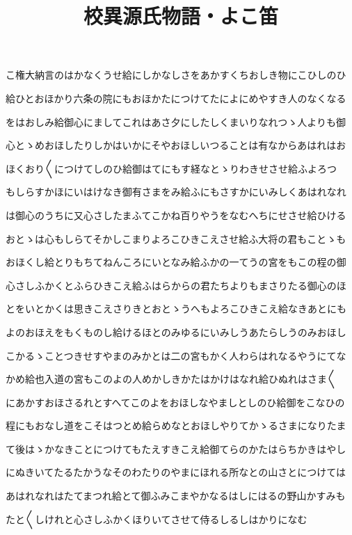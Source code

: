 \documentclass[a4paper,11pt,landscape]{ltjtarticle}
\title{校異源氏物語・よこ笛}
\date{}
\begin{document}
\maketitle

こ権大納言のはかなくうせ給にしかなしさをあかすくちおしき物にこひしのひ
\par\medskip
給ひとおほかり六条の院にもおほかたにつけてたによにめやすき人のなくなる
\par\medskip
をはおしみ給御心にましてこれはあさ夕にしたしくまいりなれつゝ人よりも御
\par\medskip
心とゝめおほしたりしかはいかにそやおほしいつることは有なからあはれはお
\par\medskip
ほくおり〱につけてしのひ給御はてにもす経なとゝりわきせさせ給ふよろつ
\par\medskip
もしらすかほにいはけなき御有さまをみ給ふにもさすかにいみしくあはれなれ
\par\medskip
は御心のうちに又心さしたまふてこかね百りやうをなむへちにせさせ給ひける
\par\medskip
おとゝは心もしらてそかしこまりよろこひきこえさせ給ふ大将の君もことゝも
\par\medskip
おほくし給とりもちてねんころにいとなみ給ふかの一てうの宮をもこの程の御
\par\medskip
心さしふかくとふらひきこえ給ふはらからの君たちよりもまさりたる御心のほ
\par\medskip
とをいとかくは思きこえさりきとおとゝうへもよろこひきこえ給なきあとにも
\par\medskip
よのおほえをもくものし給けるほとのみゆるにいみしうあたらしうのみおほし
\par\medskip
こかるゝことつきせすやまのみかとは二の宮もかく人わらはれなるやうにてな
\par\medskip
かめ給也入道の宮もこのよの人めかしきかたはかけはなれ給ひぬれはさま〱
\par\medskip
にあかすおほさるれとすへてこのよをおほしなやましとしのひ給御をこなひの
\par\medskip
程にもおなし道をこそはつとめ給らめなとおほしやりてかゝるさまになりたま
\par\medskip
て後はゝかなきことにつけてもたえすきこえ給御てらのかたはらちかきはやし
\par\medskip
にぬきいてたるたかうなそのわたりのやまにほれる所なとの山さとにつけては
\par\medskip
あはれなれはたてまつれ給とて御ふみこまやかなるはしにはるの野山かすみも
\par\medskip
たと〱しけれと心さしふかくほりいてさせて侍るしるしはかりになむ
\end{document}
